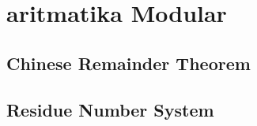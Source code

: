 \section{aritmatika Modular}
\subsection{Chinese Remainder Theorem}
\subsection{Residue Number System}
